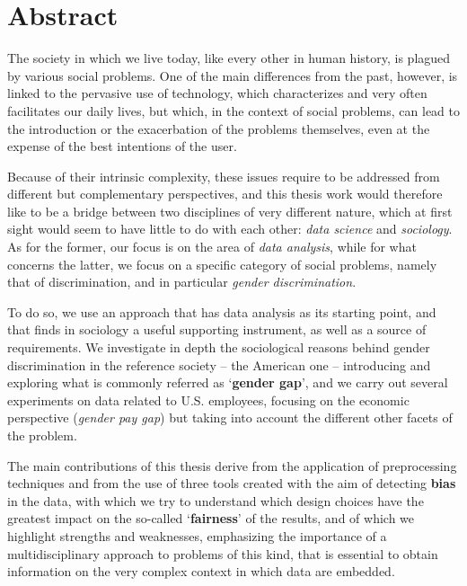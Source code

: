 
\newpage
\chapter*{Abstract}


The society in which we live today, like every other in human history, is plagued by various social problems. One of the main differences from the past, however, is linked to the pervasive use of technology, which characterizes and very often facilitates our daily lives, but which, in the context of social problems, can lead to the introduction or the exacerbation of the problems themselves, even at the expense of the best intentions of the user.

Because of their intrinsic complexity, these issues require to be addressed from different but complementary perspectives, and this thesis work would therefore like to be a bridge between two disciplines of very different nature, which at first sight would seem to have little to do with each other: \textit{data science} and \textit{sociology}. As for the former, our focus is on the area of \textit{data analysis}, while for what concerns the latter, we focus on a specific category of social problems, namely that of discrimination, and in particular \textit{gender discrimination}.

To do so, we use an approach that has data analysis as its starting point, and that finds in sociology a useful supporting instrument, as well as a source of requirements. We investigate in depth the sociological reasons behind gender discrimination in the reference society -- the American one -- introducing and exploring what is commonly referred as `\textbf{gender gap}', and we carry out several experiments on data related to U.S. employees, focusing on the economic perspective (\textit{gender pay gap}) but taking into account the different other facets of the problem.

The main contributions of this thesis derive from the application of preprocessing techniques and from the use of three tools created with the aim of detecting \textbf{bias} in the data, with which we try to understand which design choices have the greatest impact on the so-called `\textbf{fairness}' of the results, and of which we highlight strengths and weaknesses, emphasizing the importance of a multidisciplinary approach to problems of this kind, that is essential to obtain information on the very complex context in which data are embedded.

